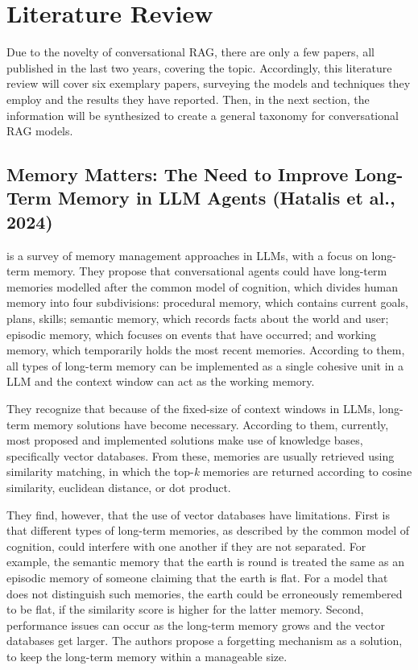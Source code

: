 \section{Literature Review}

Due to the novelty of conversational RAG, there are only a few papers, all published in the last two years, covering the topic. Accordingly, this literature review will cover six exemplary papers, surveying the models and techniques they employ and the results they have reported. Then, in the next section, the information will be synthesized to create a general taxonomy for conversational RAG models.


\subsection{Memory Matters: The Need to Improve Long-Term Memory in LLM Agents (Hatalis et al., 2024)}

\cite{Hatalis2024} is a survey of memory management approaches in LLMs, with a focus on long-term memory. They propose that conversational agents could have long-term memories modelled after the common model of cognition, which divides human memory into four subdivisions: procedural memory, which contains current goals, plans, skills; semantic memory, which records facts about the world and user; episodic memory, which focuses on events that have occurred; and working memory, which temporarily holds the most recent memories. According to them, all types of long-term memory can be implemented as a single cohesive unit in a LLM and the context window can act as the working memory.

They recognize that because of the fixed-size of context windows in LLMs, long-term memory solutions have become necessary. According to them, currently, most proposed and implemented solutions make use of knowledge bases, specifically vector databases. From these, memories are usually retrieved using similarity matching, in which the top-\textit{k} memories are returned according to cosine similarity, euclidean distance, or dot product.

They find, however, that the use of vector databases have limitations. First is that different types of long-term memories, as described by the common model of cognition, could interfere with one another if they are not separated. For example, the semantic memory that the earth is round is treated the same as an episodic memory of someone claiming that the earth is flat. For a model that does not distinguish such memories, the earth could be erroneously remembered to be flat, if the similarity score is higher for the latter memory. Second, performance issues can occur as the long-term memory grows and the vector databases get larger. The authors propose a forgetting mechanism as a solution, to keep the long-term memory within a manageable size.



